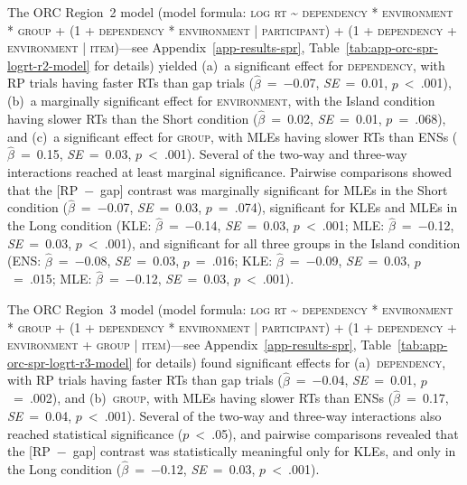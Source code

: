 The ORC Region~2 model (model formula: \textsc{log rt \~{} dependency * environment * group + (1 + dependency * environment | participant) + (1 + dependency + environment | item)}---see Appendix~\ref{app-results-spr}, Table~\ref{tab:app-orc-spr-logrt-r2-model} for details) yielded (a)~a significant effect for \textsc{dependency}, with RP trials having faster RTs than gap trials ($\hat{\beta}$~=~−0.07, \textit{SE}~=~0.01, $p$~<~.001), (b)~a marginally significant effect for \textsc{environment}, with the Island condition having slower RTs than the Short condition ($\hat{\beta}$~=~0.02, \textit{SE}~=~0.01, $p$~=~.068), and (c)~a significant effect for \textsc{group}, with MLEs having slower RTs than ENSs ($\hat{\beta}$~=~0.15, \textit{SE}~=~0.03, $p$~<~.001). Several of the two-way and three-way interactions reached at least marginal significance. Pairwise comparisons showed that the [RP~−~gap] contrast was marginally significant for MLEs in the Short condition ($\hat{\beta}$~=~−0.07, \textit{SE}~=~0.03, $p$~=~.074), significant for KLEs and MLEs in the Long condition (KLE: $\hat{\beta}$~=~−0.14, \textit{SE}~=~0.03, $p$~<~.001; MLE: $\hat{\beta}$~=~−0.12, \textit{SE}~=~0.03, $p$~<~.001), and significant for all three groups in the Island condition (ENS: $\hat{\beta}$~=~−0.08, \textit{SE}~=~0.03, $p$~=~.016; KLE: $\hat{\beta}$~=~−0.09, \textit{SE}~=~0.03, $p$~=~.015; MLE: $\hat{\beta}$~=~−0.12, \textit{SE}~=~0.03, $p$~<~.001).

The ORC Region~3 model (model formula: \textsc{log rt \~{} dependency * environment * group + (1 + dependency * environment | participant) + (1 + dependency + environment + group | item)}---see Appendix~\ref{app-results-spr}, Table~\ref{tab:app-orc-spr-logrt-r3-model} for details) found significant effects for (a)~\textsc{dependency}, with RP trials having faster RTs than gap trials ($\hat{\beta}$~=~−0.04, \textit{SE}~=~0.01, $p$~=~.002), and (b)~\textsc{group}, with MLEs having slower RTs than ENSs ($\hat{\beta}$~=~0.17, \textit{SE}~=~0.04, $p$~<~.001). Several of the two-way and three-way interactions also reached statistical significance ($p$~<~.05), and pairwise comparisons revealed that the [RP~−~gap] contrast was statistically meaningful only for KLEs, and only in the Long condition ($\hat{\beta}$~=~−0.12, \textit{SE}~=~0.03, $p$~<~.001).


